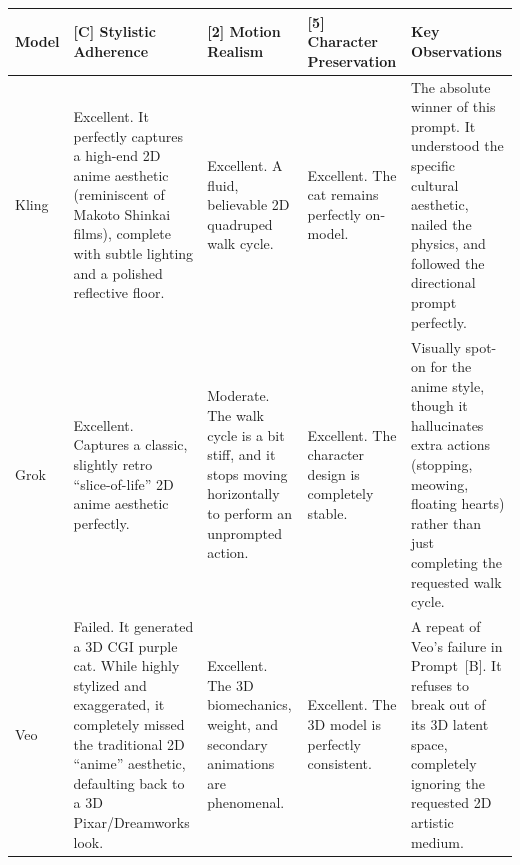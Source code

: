 \documentclass[sigconf]{acmart}
\begin{document}
\begin{table}[H]
    \centering
    \renewcommand{\arraystretch}{1.3}
    \begin{tabularx}{\textwidth}{| l | >{\raggedright\arraybackslash}X | >{\raggedright\arraybackslash}X | >{\raggedright\arraybackslash}X | >{\raggedright\arraybackslash}X |}
        \hline
        \textbf{Model} & \textbf{[C] Stylistic Adherence}                                                                                                                                                             & \textbf{[2] Motion Realism}                                                                                & \textbf{[5] Character Preservation}                                 & \textbf{Key Observations}                                                                                                                                             \\ \hline
        Kling          & Excellent. It perfectly captures a high-end 2D anime aesthetic (reminiscent of Makoto Shinkai films), complete with subtle lighting and a polished reflective floor.                         & Excellent. A fluid, believable 2D quadruped walk cycle.                                                    & Excellent. The cat remains perfectly on-model.                      & The absolute winner of this prompt. It understood the specific cultural aesthetic, nailed the physics, and followed the directional prompt perfectly.                 \\ \hline
        Grok           & Excellent. Captures a classic, slightly retro ``slice-of-life'' 2D anime aesthetic perfectly.                                                                                                & Moderate. The walk cycle is a bit stiff, and it stops moving horizontally to perform an unprompted action. & Excellent. The character design is completely stable.               & Visually spot-on for the anime style, though it hallucinates extra actions (stopping, meowing, floating hearts) rather than just completing the requested walk cycle. \\ \hline
        Veo            & Failed. It generated a 3D CGI purple cat. While highly stylized and exaggerated, it completely missed the traditional 2D ``anime'' aesthetic, defaulting back to a 3D Pixar/Dreamworks look. & Excellent. The 3D biomechanics, weight, and secondary animations are phenomenal.                           & Excellent. The 3D model is perfectly consistent.                    & A repeat of Veo's failure in Prompt~[B]. It refuses to break out of its 3D latent space, completely ignoring the requested 2D artistic medium.                        \\ \hline

\end{tabularx}
\end{table}
\end{document}
